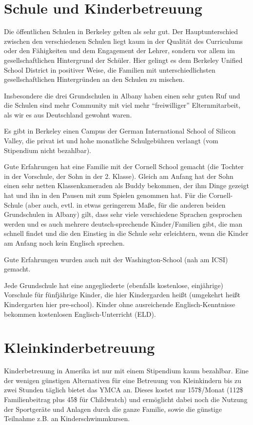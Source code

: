 \documentclass[a4paper]{scrreprt}
\begin{document}
\section{Schule und Kinderbetreuung}

Die öffentlichen Schulen in Berkeley gelten als sehr gut. Der Hauptunterschied zwischen den verschiedenen Schulen liegt kaum in der Qualität des Curriculums oder den Fähigkeiten und dem Engagement der Lehrer, sondern vor allem im gesellschaftlichen Hintergrund der Schüler. Hier gelingt es dem Berkeley Unified School District in positiver Weise, die Familien mit unterschiedlichsten gesellschaftlichen Hintergründen an den Schulen zu mischen.

Insbesondere die drei Grundschulen in Albany haben einen sehr guten Ruf und die Schulen sind mehr Community mit viel mehr "`freiwilliger"' Elternmitarbeit, als wir es aus Deutschland gewohnt waren.

Es gibt in Berkeley einen Campus der German International School of Silicon Valley, die privat ist und hohe monatliche Schulgebühren verlangt (vom Stipendium nicht bezahlbar).

Gute Erfahrungen hat eine Familie mit der Cornell School gemacht (die Tochter in der Vorschule, der Sohn in der 2. Klasse). Gleich am Anfang hat der Sohn einen sehr netten Klassenkameraden als Buddy bekommen, der ihm Dinge gezeigt hat und ihn in den Pausen mit zum Spielen genommen hat. Für die Cornell-Schule (aber auch, evtl. in etwas geringerem Maße, für die anderen beiden Grundschulen in Albany) gilt, dass sehr viele verschiedene Sprachen gesprochen werden und es auch mehrere deutsch-sprechende Kinder/Familien gibt, die man schnell findet und die den Einstieg in die Schule sehr erleichtern, wenn die Kinder am Anfang noch kein Englisch sprechen.

Gute Erfahrungen wurden auch mit der Washington-School (nah am ICSI) gemacht.

Jede Grundschule hat eine angegliederte (ebenfalls kostenlose, einjährige) Vorschule für fünfjährige Kinder, die hier Kindergarden heißt (umgekehrt heißt Kindergarten hier pre-school). Kinder ohne ausreichende Englisch-Kenntnisse bekommen kostenlosen Englisch-Unterricht (ELD).

\section{Kleinkinderbetreuung}

Kinderbetreuung in Amerika ist nur mit einem Stipendium kaum bezahlbar. Eine der wenigen günstigen Alternativen für eine Betreuung von Kleinkindern bis zu zwei Stunden täglich bietet das YMCA an. Dieses kostet nur 157\$/Monat (112\$ Familienbeitrag plus 45\$ für Childwatch) und ermöglicht dabei noch die Nutzung der Sportgeräte und Anlagen durch die ganze Familie, sowie die günstige Teilnahme z.B. an Kinderschwimmkursen.
\end{document}
